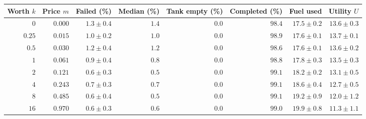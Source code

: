 \begin{tabular}{@{}rrrrrrrr@{}}
\toprule
Worth $k$ & Price $m$ & Failed (\%) & Median (\%) & Tank empty (\%) & Completed (\%) & Fuel used & Utility $U$ \\
\midrule
$0$ & $0.000$ & $1.3\pm0.4$ & $1.4$ & $0.0$ & $98.4$ & $17.5\pm0.2$ & $13.6\pm0.3$ \\
$0.25$ & $0.015$ & $1.0\pm0.2$ & $1.0$ & $0.0$ & $98.9$ & $17.6\pm0.1$ & $13.7\pm0.1$ \\
$0.5$ & $0.030$ & $1.2\pm0.4$ & $1.2$ & $0.0$ & $98.6$ & $17.6\pm0.1$ & $13.6\pm0.2$ \\
$1$ & $0.061$ & $0.9\pm0.4$ & $0.8$ & $0.0$ & $98.8$ & $17.8\pm0.3$ & $13.5\pm0.3$ \\
$2$ & $0.121$ & $0.6\pm0.3$ & $0.5$ & $0.0$ & $99.1$ & $18.2\pm0.2$ & $13.1\pm0.5$ \\
$4$ & $0.243$ & $0.7\pm0.3$ & $0.7$ & $0.0$ & $99.1$ & $18.6\pm0.4$ & $12.7\pm0.5$ \\
$8$ & $0.485$ & $0.6\pm0.4$ & $0.5$ & $0.0$ & $99.1$ & $19.2\pm0.9$ & $12.0\pm1.2$ \\
$16$ & $0.970$ & $0.6\pm0.3$ & $0.6$ & $0.0$ & $99.0$ & $19.9\pm0.8$ & $11.3\pm1.1$ \\
\bottomrule
\end{tabular}
